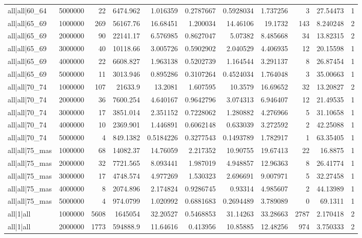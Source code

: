 \begin{tabular}{lrrrrrrrrrr}
all|all|60\_64 & 5000000 & 22 & 6474.962 & 1.016359 & 0.2787667 & 0.5928034 & 1.737256 & 3 & 27.54473 & 1 \\
all|all|65\_69 & 1000000 & 269 & 56167.76 & 16.68451 & 1.200034 & 14.46106 & 19.1732 & 143 & 8.240248 & 2 \\
all|all|65\_69 & 2000000 & 90 & 22141.17 & 6.576985 & 0.8627047 & 5.07382 & 8.485668 & 34 & 13.82315 & 2 \\
all|all|65\_69 & 3000000 & 40 & 10118.66 & 3.005726 & 0.5902902 & 2.040529 & 4.406935 & 12 & 20.15598 & 1 \\
all|all|65\_69 & 4000000 & 22 & 6608.827 & 1.963138 & 0.5202739 & 1.164544 & 3.291137 & 8 & 26.87454 & 1 \\
all|all|65\_69 & 5000000 & 11 & 3013.946 & 0.895286 & 0.3107264 & 0.4524034 & 1.764048 & 3 & 35.00663 & 1 \\
all|all|70\_74 & 1000000 & 107 & 21633.9 & 13.2081 & 1.607595 & 10.3579 & 16.69652 & 32 & 13.20827 & 2 \\
all|all|70\_74 & 2000000 & 36 & 7600.254 & 4.640167 & 0.9642796 & 3.074313 & 6.946407 & 12 & 21.49535 & 1 \\
all|all|70\_74 & 3000000 & 17 & 3851.014 & 2.351152 & 0.7228062 & 1.280882 & 4.276966 & 5 & 31.10658 & 1 \\
all|all|70\_74 & 4000000 & 10 & 2369.901 & 1.446891 & 0.6062148 & 0.633039 & 3.272592 & 2 & 42.25088 & 1 \\
all|all|70\_74 & 5000000 & 4 & 849.1382 & 0.5184226 & 0.3277543 & 0.1493789 & 1.782917 & 1 & 63.35405 & 1 \\
all|all|75\_mas & 1000000 & 68 & 14082.37 & 14.76059 & 2.217352 & 10.90755 & 19.67413 & 22 & 16.8875 & 1 \\
all|all|75\_mas & 2000000 & 32 & 7721.565 & 8.093441 & 1.987019 & 4.948857 & 12.96363 & 8 & 26.41774 & 1 \\
all|all|75\_mas & 3000000 & 17 & 4748.574 & 4.977269 & 1.530323 & 2.696691 & 9.007971 & 5 & 32.27458 & 1 \\
all|all|75\_mas & 4000000 & 8 & 2074.896 & 2.174824 & 0.9286745 & 0.93314 & 4.985607 & 2 & 44.13989 & 1 \\
all|all|75\_mas & 5000000 & 4 & 974.0799 & 1.020992 & 0.6881683 & 0.2694489 & 3.789089 & 0 & 69.1311 & 1 \\
all|1|all & 1000000 & 5608 & 1645054 & 32.20527 & 0.5468853 & 31.14263 & 33.28663 & 2787 & 2.170418 & 2 \\
all|1|all & 2000000 & 1773 & 594888.9 & 11.64616 & 0.413956 & 10.85885 & 12.48256 & 974 & 3.750333 & 2 \\

\end{tabular}
